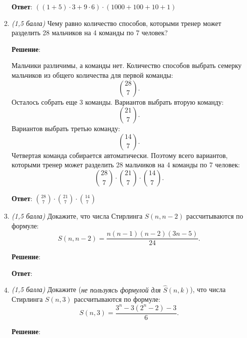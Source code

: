 \documentclass{article}
\begin{document}
\begin{enumerate}
    \textbf{Ответ}:
    $((1 + 5) \cdot 3 + 9 \cdot 6) \cdot (1000 + 100 + 10 + 1)$

    
    \item \textit{(1,5 балла)} Чему равно количество способов, которыми тренер может разделить 28 мальчиков на 4 команды по 7 человек?
    
    \textbf{Решение}:

    Мальчики различимы, а команды нет. Количество способов выбрать семерку мальчиков из общего количества для первой команды:
    \begin{equation}
        \binom{28}{7}.
    \end{equation}
    Осталось собрать еще 3 команды. Вариантов выбрать вторую команду:
    \begin{equation}
        \binom{21}{7}.
    \end{equation}
    Вариантов выбрать третью команду:
    \begin{equation}
        \binom{14}{7}.
    \end{equation}
    Четвертая команда собирается автоматически. Поэтому всего вариантов, которыми тренер может разделить 28 мальчиков на 4 команды по 7 человек:
    \begin{equation}
        \binom{28}{7} \cdot \binom{21}{7} \cdot \binom{14}{7}.
    \end{equation}

    \textbf{Ответ}:
    $\binom{28}{7} \cdot \binom{21}{7} \cdot \binom{14}{7}$
   
    \item \textit{(1,5 балла)} Докажите, что числа Стирлинга $S(n,n-2)$ рассчитываются по формуле:
    $$S(n,n-2)=\frac{n(n-1)(n-2)(3n-5)}{24}.$$

    \textbf{Решение}:



    \textbf{Ответ}:

    
    \item \textit{(1,5 балла)} Докажите (\textit{не пользуясь формулой для $\hat{S}(n,k)$}), что числа Стирлинга $S(n,3)$ рассчитываются по формуле:
    $$S(n,3)=\frac{3^n-3(2^n-2)-3}{6}.$$

    
    \textbf{Решение}:




\end{enumerate}
\end{document}
